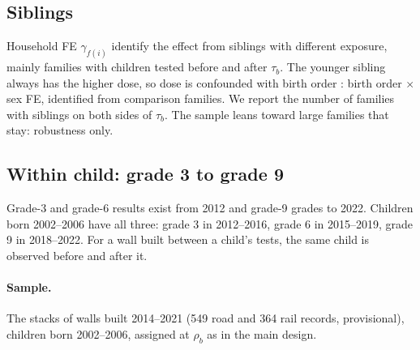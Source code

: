 \documentclass[11pt]{article}
\begin{document}
\subsection{Siblings}

Household FE \(\gamma_{f(i)}\) identify the effect from siblings with different exposure, mainly
families with children tested before and after \(\tau_b\). The younger sibling always has the
higher dose, so dose is confounded with birth order \autocite{blackMoreMerrierEffect2005}:
birth order \(\times\) sex FE, identified from comparison families. We report the number of
families with siblings on both sides of \(\tau_b\). The sample leans toward large families that
stay: robustness only.

\subsection{Within child: grade 3 to grade 9}\label{sec:withinchild}

Grade-3 and grade-6 results exist from 2012 and grade-9 grades to 2022. Children born
2002--2006 have all three: grade 3 in 2012--2016, grade 6 in 2015--2019, grade 9 in 2018--2022.
For a wall built between a child's tests, the same child is observed before and after it.

\paragraph{Sample.} The stacks of walls built 2014--2021 (549 road and 364 rail records,
provisional), children born 2002--2006, assigned at \(\rho_b\) as in the main design.
\end{document}
